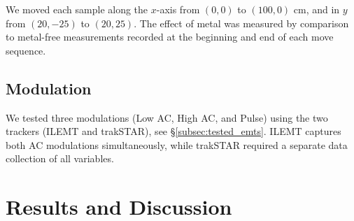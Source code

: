 \documentclass[journal,twoside,web]{ieeecolor}
\begin{document}
We moved each sample along the $x$-axis from $(0, 0)$ to $(100, 0)$ cm, and in $y$ from $(20, -25)$ to $(20, 25)$. The effect of metal was measured by comparison to metal-free measurements recorded at the beginning and end of each move sequence.

\subsection{Modulation}
We tested three modulations (Low AC, High AC, and Pulse) using the two trackers (ILEMT and trakSTAR), see \S\ref{subsec:tested_emts}. ILEMT captures both AC modulations simultaneously, while trakSTAR required a separate data collection of all variables.

\section{Results and Discussion}
\end{document}
